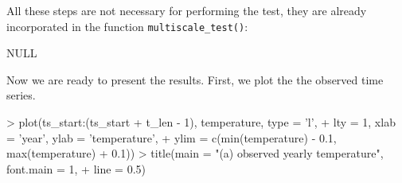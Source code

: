\documentclass[a4paper]{scrartcl}
\begin{document}

All these steps are not necessary for performing the test, they are already incorporated in the function \verb|multiscale_test()|:

\begin{Schunk}
\begin{Soutput}
NULL
\end{Soutput}
\end{Schunk}

Now we are ready to present the results. First, we plot the the observed time series.

\begin{Schunk}
\begin{Sinput}
> plot(ts_start:(ts_start + t_len - 1), temperature, type = 'l',
+      lty = 1, xlab = 'year', ylab = 'temperature',
+      ylim = c(min(temperature) - 0.1, max(temperature) + 0.1))
> title(main = "(a) observed yearly temperature", font.main = 1,
+       line = 0.5)
\end{Sinput}
\end{Schunk}
\end{document}

